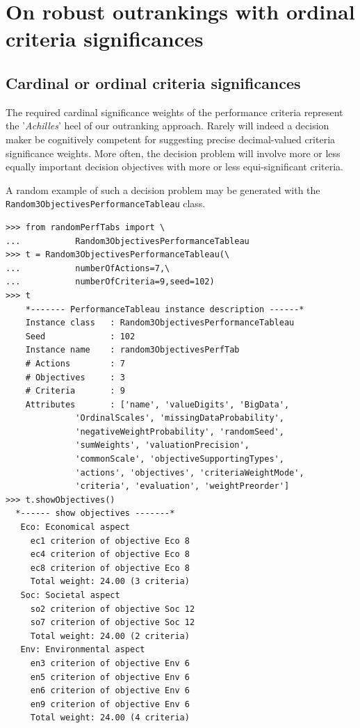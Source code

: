 \chapter[On robust outrankings]{On robust outrankings with ordinal criteria significances}
\label{sec:19}

\abstract*{}

\abstract{}

\section{Cardinal or ordinal criteria significances}
\label{sec:19.1}

The required cardinal significance weights of the performance criteria represent the '\emph{Achilles}' heel of our outranking approach. Rarely will indeed a decision maker be cognitively competent for suggesting precise decimal-valued criteria significance weights. More often, the decision problem will involve more or less equally important decision objectives with more or less equi-significant criteria.

A random example of such a decision problem may be generated with the \texttt{Random3ObjectivesPerformanceTableau} class.

\begin{lstlisting}[caption={Generate a Random 3 Objectives Performance Tableau},label=list:19.1]
>>> from randomPerfTabs import \
...           Random3ObjectivesPerformanceTableau
>>> t = Random3ObjectivesPerformanceTableau(\
...           numberOfActions=7,\
...           numberOfCriteria=9,seed=102)
>>> t
    *------- PerformanceTableau instance description ------*
    Instance class   : Random3ObjectivesPerformanceTableau
    Seed             : 102
    Instance name    : random3ObjectivesPerfTab
    # Actions        : 7
    # Objectives     : 3
    # Criteria       : 9
    Attributes       : ['name', 'valueDigits', 'BigData',
              'OrdinalScales', 'missingDataProbability',
              'negativeWeightProbability', 'randomSeed',
              'sumWeights', 'valuationPrecision',
              'commonScale', 'objectiveSupportingTypes',
              'actions', 'objectives', 'criteriaWeightMode',
              'criteria', 'evaluation', 'weightPreorder']
>>> t.showObjectives()
  *------ show objectives -------*
   Eco: Economical aspect
     ec1 criterion of objective Eco 8
     ec4 criterion of objective Eco 8
     ec8 criterion of objective Eco 8
     Total weight: 24.00 (3 criteria)
   Soc: Societal aspect
     so2 criterion of objective Soc 12
     so7 criterion of objective Soc 12
     Total weight: 24.00 (2 criteria)
   Env: Environmental aspect
     en3 criterion of objective Env 6
     en5 criterion of objective Env 6
     en6 criterion of objective Env 6
     en9 criterion of objective Env 6
     Total weight: 24.00 (4 criteria)
\end{lstlisting}

